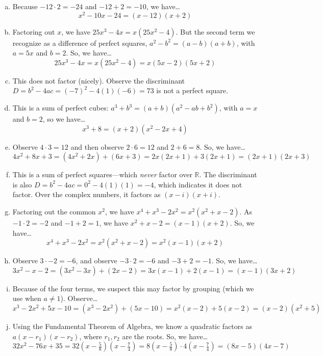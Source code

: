 \documentclass[11pt,letterpaper]{article}
\begin{document}
	\begin{enumerate}[(a)]
	\item Because $-12 \cdot 2= -24$ and $-12 + 2= -10$, we have\dots
		\[
		x^2 - 10x - 24= (x - 12)(x + 2)
		\]
	
	\item Factoring out $x$, we have $25x^3 - 4x= x(25x^2 - 4)$. But the second term we recognize as a difference of perfect squares, $a^2 - b^2= (a - b)(a + b)$, with $a= 5x$ and $b= 2$. So, we have\dots
		\[
		25x^3 - 4x= x(25x^2 - 4)= x(5x - 2)(5x + 2)
		\]
	
	\item This does not factor (nicely). Observe the discriminant $D= b^2 - 4ac= (-7)^2 - 4(1)(-6)= 73$ is not a perfect square.
	
	\item This is a sum of perfect cubes: $a^3 + b^3= (a + b)(a^2 - ab + b^2)$, with $a= x$ and $b= 2$, so we have\dots
		\[
		x^3 + 8= (x + 2)(x^2 - 2x + 4)
		\]
	
	\item Observe $4 \cdot 3= 12$ and then observe $2 \cdot 6= 12$ and $2 + 6= 8$. So, we have\dots
		\[
		4x^2 + 8x + 3= (4x^2 + 2x) + (6x + 3)= 2x(2x + 1) + 3(2x + 1)= (2x + 1)(2x + 3)
		\]
	
	\item This is a sum of perfect squares---which \textit{never} factor over $\mathbb{R}$. The discriminant is also $D= b^2 - 4ac= 0^2 - 4(1)(1)= -4$, which indicates it does not factor. Over the complex numbers, it factors as $(x - i)(x + i)$.
	
	\item Factoring out the common $x^2$, we have $x^4 + x^3 - 2x^2= x^2(x^2 + x - 2)$. As $-1 \cdot 2= -2$ and $-1 + 2= 1$, we have $x^2 + x - 2= (x - 1)(x + 2)$. So, we have\dots
		\[
		x^4 + x^3 - 2x^2= x^2(x^2 + x - 2)= x^2(x - 1)(x + 2)
		\]
	
	\item Observe $3 \cdot -2= -6$, and observe $-3 \cdot 2= -6$ and $-3 + 2= -1$. So, we have\dots
		\[
		3x^2 - x - 2= (3x^2 - 3x) + (2x - 2)= 3x(x - 1) + 2(x - 1)= (x - 1)(3x + 2)
		\]
	
	\item Because of the four terms, we suspect this may factor by grouping (which we use when $a \neq 1$). Observe\dots
		\[
		x^3 - 2x^2 + 5x - 10= (x^3 - 2x^2) + (5x - 10)= x^2(x - 2) + 5(x - 2)= (x - 2)(x^2 + 5)
		\]
	
	\item Using the Fundamental Theorem of Algebra, we know a quadratic factors as $a(x - r_1)(x - r_2)$, where $r_1, r_2$ are the roots. So, we have\dots
		\[
		32x^2 - 76x + 35= 32 \left( x - \tfrac{5}{8} \right) \left( x - \tfrac{7}{4} \right)= 8 \left( x - \tfrac{5}{8} \right) \cdot 4 \left( x - \tfrac{7}{4} \right)= (8x - 5)(4x - 7)
		\]
	\end{enumerate}
\end{document}
